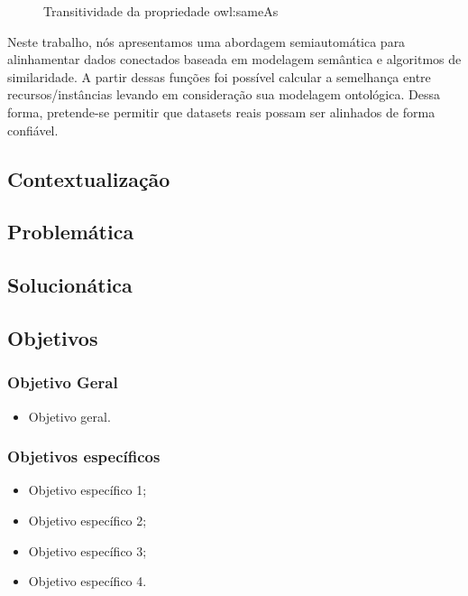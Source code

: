 \begin{figure}[h]
\centering
{}
\caption{Transitividade da propriedade owl:sameAs}
\label{sameAs}
\end{figure}

Neste trabalho, nós apresentamos uma abordagem semiautomática para  alinhamentar dados conectados baseada em modelagem semântica e algoritmos de similaridade. A partir dessas funções foi possível calcular a semelhança entre recursos/instâncias levando em consideração sua modelagem ontológica. Dessa forma, pretende-se permitir que datasets reais possam ser alinhados de forma confiável.

\subsection*{Contextualização}

\subsection*{Problemática}

\subsection*{Solucionática}

\subsection*{Objetivos}

\subsubsection*{Objetivo Geral}

\begin{itemize}
	\item Objetivo geral.
\end{itemize}

\subsubsection*{Objetivos específicos}
\begin{itemize}
\item Objetivo específico 1;
\item Objetivo específico 2;
\item Objetivo específico 3;
\item Objetivo específico 4.
\end{itemize}

